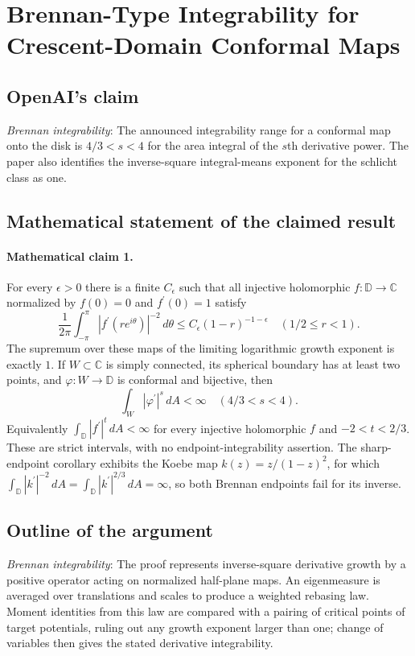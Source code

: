 \documentclass[11pt]{article}
\begin{document}
\section*{Brennan-Type Integrability for Crescent-Domain Conformal Maps}

\subsection{OpenAI's claim}
\textit{Brennan integrability}: The announced integrability range for a conformal map onto the disk is $4/3<s<4$ for the area integral of the $s$th derivative power. The paper also identifies the inverse-square integral-means exponent for the schlicht class as one.

\subsection{Mathematical statement of the claimed result}
\paragraph{Mathematical claim 1.} For every $\epsilon>0$ there is a finite $C_\epsilon$ such that all injective holomorphic $f:\mathbb D\to\mathbb C$ normalized by $f(0)=0$ and $f^\prime(0)=1$ satisfy \[\frac1{2\pi}\int_{-\pi}^{\pi}|f^\prime(re^{i\theta})|^{-2}\,d\theta\le C_\epsilon(1-r)^{-1-\epsilon}\quad(1/2\le r<1).\] The supremum over these maps of the limiting logarithmic growth exponent is exactly $1$. If $W\subset\mathbb C$ is simply connected, its spherical boundary has at least two points, and $\varphi:W\to\mathbb D$ is conformal and bijective, then \[\int_W|\varphi^\prime|^s\,dA<\infty\quad(4/3<s<4).\] Equivalently $\int_{\mathbb D}|f^\prime|^t\,dA<\infty$ for every injective holomorphic $f$ and $-2<t<2/3$. These are strict intervals, with no endpoint-integrability assertion. The sharp-endpoint corollary exhibits the Koebe map $k(z)=z/(1-z)^2$, for which $\int_{\mathbb D}|k^\prime|^{-2}\,dA=\int_{\mathbb D}|k^\prime|^{2/3}\,dA=\infty$, so both Brennan endpoints fail for its inverse.

\subsection{Outline of the argument}
\textit{Brennan integrability}: The proof represents inverse-square derivative growth by a positive operator acting on normalized half-plane maps. An eigenmeasure is averaged over translations and scales to produce a weighted rebasing law. Moment identities from this law are compared with a pairing of critical points of target potentials, ruling out any growth exponent larger than one; change of variables then gives the stated derivative integrability.
\end{document}
